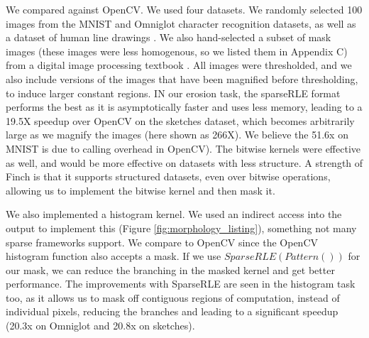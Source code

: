 We compared against OpenCV.
%
We used four datasets. We randomly selected 100 images from the MNIST \cite{lecun_gradient-based_1998} and Omniglot \cite{lake_human-level_2015} character recognition datasets, as well as a dataset of human line drawings \cite{eitz_how_2012}. 
%
We also hand-selected a subset of mask images (these images were less homogenous, so we listed them in Appendix C) from a digital image processing textbook \cite{gonzalez_digital_2006}. 
%
All images were thresholded, and we also include versions of the images that have been magnified before thresholding, to induce larger constant regions. 
%
IN our erosion task, the sparseRLE format performs the best as it is asymptotically faster and uses less memory, leading to a 19.5X speedup over OpenCV on the sketches dataset, which becomes arbitrarily large as we magnify the images (here shown as 266X). 
%
We believe the 51.6x on MNIST is due to calling overhead in OpenCV). 
%
The bitwise kernels were effective as well, and would be more effective on datasets with less structure. 
%
A strength of Finch is that it supports structured datasets, even over bitwise operations, allowing us to implement the bitwise kernel and then mask it.

We also implemented a histogram kernel.
%
We used an indirect access into the output to implement this (Figure \ref{fig:morphology_listing}), something not many sparse frameworks support.
%
We compare to OpenCV since the OpenCV histogram function also accepts a mask. 
%
If we use $SparseRLE(Pattern())$ for our mask, we can reduce the branching
in the masked kernel and get better performance.
%
The improvements with SparseRLE are seen in the histogram task too, as it allows us to mask off contiguous regions of computation, instead of individual pixels, reducing the branches and leading to a significant speedup (20.3x on Omniglot and 20.8x on sketches).
%
%

